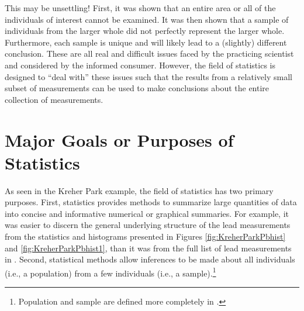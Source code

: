 \documentclass[10pt,openany]{book}\usepackage[]{graphicx}\usepackage[]{color}
\begin{document}


This may be unsettling! First, it was shown that an entire area or all of the individuals of interest cannot be examined. It was then shown that a sample of individuals from the larger whole did not perfectly represent the larger whole. Furthermore, each sample is unique and will likely lead to a (slightly) different conclusion. These are all real and difficult issues faced by the practicing scientist and considered by the informed consumer. However, the field of statistics is designed to ``deal with'' these issues such that the results from a relatively small subset of measurements can be used to make conclusions about the entire collection of measurements.



\section{Major Goals or Purposes of Statistics}
\vspace{-12pt}
As seen in the Kreher Park example, the field of statistics has two primary purposes. First, statistics provides methods to summarize large quantities of data into concise and informative numerical or graphical summaries. For example, it was easier to discern the general underlying structure of the lead measurements from the statistics and histograms presented in Figures \ref{fig:KreherParkPbhist} and \ref{fig:KreherParkPbhist1}, than it was from the full list of lead measurements in . Second, statistical methods allow inferences to be made about all individuals (i.e., a population) from a few individuals (i.e., a sample).\footnote{Population and sample are defined more completely in .}

\end{document}
